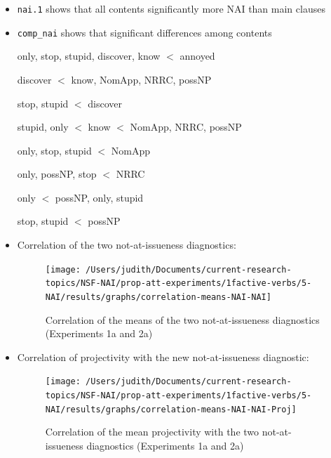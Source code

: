 \documentclass[11pt,fleqn]{article}
\newcommand{\6}{\mbox{$[\hspace*{-.6mm}[$}}
\newcommand{\9}{\mbox{$]\hspace*{-.6mm}]$}}
\begin{document}
\begin{itemize}

\item {\tt nai.1} shows that all contents significantly more NAI than main clauses

\item {\tt comp\_nai} shows that significant differences among contents

only, stop, stupid, discover, know $<$ annoyed

discover $<$ know, NomApp, NRRC, possNP

stop, stupid $<$ discover 

stupid, only $<$ know $<$ NomApp, NRRC, possNP

only, stop, stupid $<$ NomApp

only, possNP, stop $<$ NRRC

only $<$ possNP, only, stupid

stop, stupid $<$ possNP

\item Correlation of the two not-at-issueness diagnostics:

\begin{figure}[!h]

\begin{center}

\texttt{[image: /Users/judith/Documents/current-research-topics/NSF-NAI/prop-att-experiments/1factive-verbs/5-NAI/results/graphs/correlation-means-NAI-NAI]}
\end{center}

\caption{Correlation of the means of the two not-at-issueness diagnostics (Experiments 1a and 2a)}\label{f-corr1}
\end{figure}


\item Correlation of projectivity with the new not-at-issueness diagnostic:

\begin{figure}[!h]

\begin{center}

\texttt{[image: /Users/judith/Documents/current-research-topics/NSF-NAI/prop-att-experiments/1factive-verbs/5-NAI/results/graphs/correlation-means-NAI-NAI-Proj]}
\end{center}

\caption{Correlation of the mean projectivity with the two not-at-issueness diagnostics (Experiments 1a and 2a)}\label{f-corr2}
\end{figure}

\end{itemize}
\end{document}
